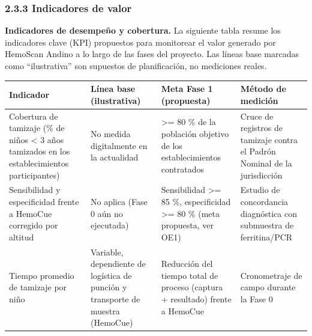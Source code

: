 \documentclass[11pt,a4paper]{article}
\begin{document}
\subsubsection{2.3.3 Indicadores de valor}\label{indicadores-de-valor}

\textbf{Indicadores de desempeño y cobertura.} La siguiente tabla resume los indicadores clave (KPI) propuestos para monitorear el valor generado por HemoScan Andino a lo largo de las fases del proyecto. Las líneas base marcadas como ``ilustrativa'' son supuestos de planificación, no mediciones reales.

{\small
\begin{longtable}[]{@{}
  >{\raggedright\arraybackslash}p{}
  >{\raggedright\arraybackslash}p{}
  >{\raggedright\arraybackslash}p{}
  >{\raggedright\arraybackslash}p{}@{}}
\toprule\noalign{}
\begin{minipage}[b]{\linewidth}\raggedright
Indicador
\end{minipage} & \begin{minipage}[b]{\linewidth}\raggedright
Línea base (ilustrativa)
\end{minipage} & \begin{minipage}[b]{\linewidth}\raggedright
Meta Fase 1 (propuesta)
\end{minipage} & \begin{minipage}[b]{\linewidth}\raggedright
Método de medición
\end{minipage} \\
\midrule\noalign{}
\endhead
\bottomrule\noalign{}
\endlastfoot
Cobertura de tamizaje (\% de niños \textless{} 3 años tamizados en los establecimientos participantes) & No medida digitalmente en la actualidad & \textgreater= 80 \% de la población objetivo de los establecimientos contratados & Cruce de registros de tamizaje contra el Padrón Nominal de la jurisdicción \\
Sensibilidad y especificidad frente a HemoCue corregido por altitud & No aplica (Fase 0 aún no ejecutada) & Sensibilidad \textgreater= 85 \%, especificidad \textgreater= 80 \% (meta propuesta, ver OE1) & Estudio de concordancia diagnóstica con submuestra de ferritina/PCR \\
Tiempo promedio de tamizaje por niño & Variable, dependiente de logística de punción y transporte de muestra (HemoCue) & Reducción del tiempo total de proceso (captura + resultado) frente a HemoCue & Cronometraje de campo durante la Fase 0 \\

\end{longtable}}
\end{document}

